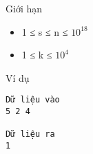 Giới hạn
\begin{itemize}
	\item     1 ≤ s ≤ n ≤ $10^{18}$
	\item     1 ≤ k ≤ $10^{4}$
\end{itemize}
Ví dụ
\begin{verbatim}
Dữ liệu vào
5 2 4

Dữ liệu ra
1
\end{verbatim}